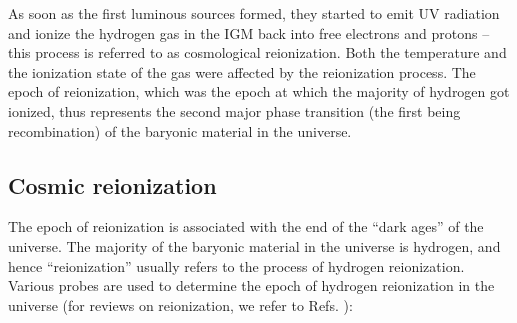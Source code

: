 As soon as the first luminous sources formed, they started to emit UV radiation and ionize the hydrogen gas in the IGM back into free electrons and protons -- this process is referred to as cosmological reionization. Both the temperature and the ionization state of the gas were affected by the reionization process. The epoch of reionization, which was the epoch at which the majority of hydrogen got ionized, thus represents the second major phase transition (the first being recombination) of the baryonic material in the universe. 




\subsection{Cosmic reionization}
\label{sec:reion}

The epoch of reionization is associated with the end of the ``dark ages'' of the universe. The majority of the baryonic material in the universe is hydrogen, and hence ``reionization'' usually refers to the process of hydrogen reionization.  Various probes are used to determine the epoch of hydrogen reionization in the universe (for reviews on reionization, we refer to Refs. \cite{loeb2001, barkana, lidz2016rev, fan2006, choudhury2006, choudhury2009, zaroubi2013, natarajan2014, ferrara2014}):

